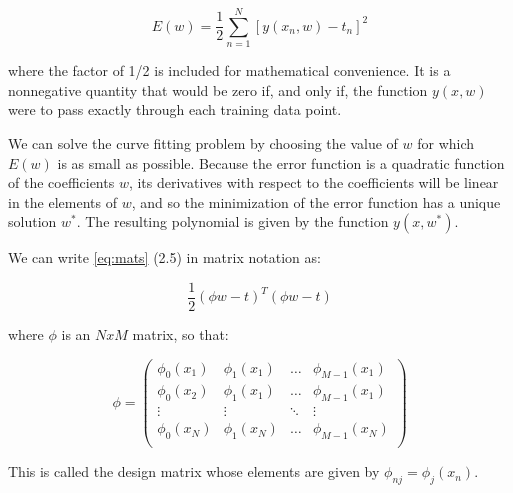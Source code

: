 \begin{Equation}[H]
	\centering
	\begin{equation}
		E(w)=\frac{1}{2} \sum_{n=1}^{N} [y(x_n,w)-t_n]^2
	\end{equation}
	\label{eq:mats}
\end{Equation}

\noindent where the factor of 1/2 is included for mathematical convenience. It is a nonnegative quantity that would be zero if, and only if, the function $y(x, w)$ were to pass exactly through each training data point.

\noindent We can solve the curve fitting problem by choosing the value of $w$ for which $E(w)$ is as small as possible. Because the error function is a quadratic function of the coefficients $w$, its derivatives with respect to the coefficients will be linear in the elements of $w$, and so the minimization of the error function has a unique solution $w^*$. The resulting polynomial is given by the function $y(x, w^*)$.

\noindent We can  write \ref{eq:mats} (2.5) in matrix notation as:

\begin{Equation}[H]
	\centering
	\begin{equation}
	\frac{1}{2} (\phi w - t)^T (\phi w - t)
	\end{equation}
	\label{eq:mathmodelaada}
\end{Equation}

\noindent where $\phi$ is an $N x M$ matrix, so that:
 

\begin{Equation}[!htb]
	\centering
	\begin{equation}
	\phi =
		\begin{pmatrix}
			\phi_0(x_1) & \phi_1(x_1) & \dots & \phi_{M-1}(x_1) \\
			\phi_0(x_2) & \phi_1(x_1) & \dots & \phi_{M-1}(x_1) \\
			\vdots & \vdots & \ddots & \vdots \\
			\phi_0(x_N) & \phi_1(x_N) & \dots & \phi_{M-1}(x_N) \\
		\end{pmatrix}
	\end{equation}
	\caption[Design matrix.]{This is called the design matrix whose elements are given by $\phi_{nj} = \phi_j(x_n)$.}
	\label{eq:hommatrix}
\end{Equation}

